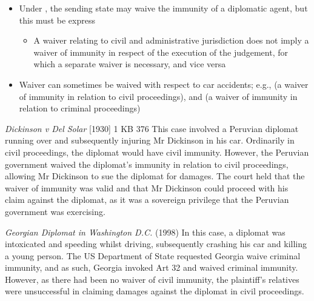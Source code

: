 \begin{itemize}
    \item Under , the sending state may waive the immunity of a diplomatic agent, but this must be express
    \begin{itemize}
        \item A waiver relating to civil and administrative jurisdiction does not imply a waiver of immunity in respect of the execution of the judgement, for which a separate waiver is necessary, and vice versa
    \end{itemize}
    \item Waiver can sometimes be waived with respect to car accidents; e.g.,  (a waiver of immunity in relation to civil proceedings), and  (a waiver of immunity in relation to criminal proceedings)
\end{itemize}

\begin{casedetails}{\textit{Dickinson v Del Solar} [1930] 1 KB 376}
    \flushleft
    This case involved a Peruvian diplomat running over and subsequently injuring Mr Dickinson in his car. Ordinarily in civil proceedings, the diplomat would have civil immunity. However, the Peruvian government waived the diplomat's immunity in relation to civil proceedings, allowing Mr Dickinson to sue the diplomat for damages. The court held that the waiver of immunity was valid and that Mr Dickinson could proceed with his claim against the diplomat, as it was a sovereign privilege that the Peruvian government was exercising.
\end{casedetails}

\begin{casedetails}{\textit{Georgian Diplomat in Washington D.C.} (1998)}
    \flushleft
    In this case, a diplomat was intoxicated and speeding whilst driving, subsequently crashing his car and killing a young person. The US Department of State requested Georgia waive criminal immunity, and as such, Georgia invoked Art 32 and waived criminal immunity. However, as there had been no waiver of civil immunity, the plaintiff's relatives were unsuccessful in claiming damages against the diplomat in civil proceedings.
\end{casedetails}

